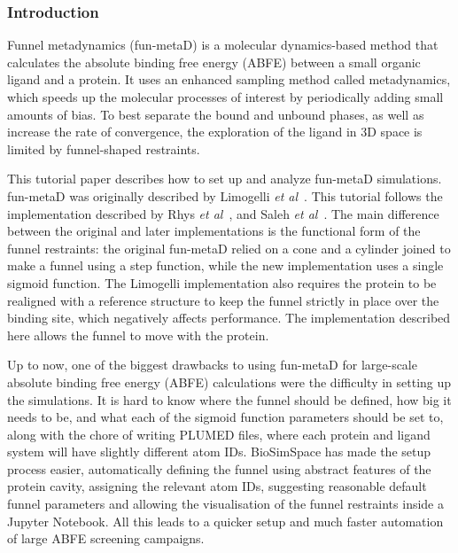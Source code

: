 \hypertarget{funnel-metadynamics-tutorial}{%
\label{funnel-metadynamics-tutorial}}
\hypertarget{Introduction}{%
\subsubsection{Introduction}\label{Introduction}}

Funnel metadynamics (fun-metaD) is a molecular dynamics-based method
that calculates the absolute binding free energy (ABFE) between a small
organic ligand and a protein. It uses an enhanced sampling method called
metadynamics, which speeds up the molecular processes of interest by
periodically adding small amounts of bias. To best separate the bound
and unbound phases, as well as increase the rate of convergence, the
exploration of the ligand in 3D space is limited by funnel-shaped
restraints.

This tutorial paper describes how to set up and analyze fun-metaD
simulations. fun-metaD was originally described by Limogelli \emph{et al}~\cite{Limongelli2013}.
This tutorial follows the implementation described by Rhys \emph{et al}~\cite{Evans2020}, and Saleh \emph{et al}~\cite{Saleh2017}. The main difference between the original and later 
implementations is the functional form of the funnel restraints: the
original fun-metaD relied on a cone and a cylinder joined to make a
funnel using a step function, while the new implementation uses a single
sigmoid function. The Limogelli implementation also requires the protein
to be realigned with a reference structure to keep the funnel strictly
in place over the binding site, which negatively affects performance. The
implementation described here allows the funnel to move with the
protein.

Up to now, one of the biggest drawbacks to using fun-metaD for
large-scale absolute binding free energy (ABFE) calculations were the
difficulty in setting up the simulations. It is hard to know where the funnel should be defined, how big it needs to be, and what each of the
sigmoid function parameters should be set to, along with the chore of
writing PLUMED files, where each protein and ligand system will have
slightly different atom IDs. BioSimSpace has made the setup process easier, 
automatically defining the funnel using abstract features of the 
protein cavity, assigning the relevant atom IDs, suggesting reasonable 
default funnel parameters and allowing the visualisation of the funnel restraints inside
a Jupyter Notebook. All this leads to a quicker setup and much 
faster automation of large ABFE screening campaigns.

